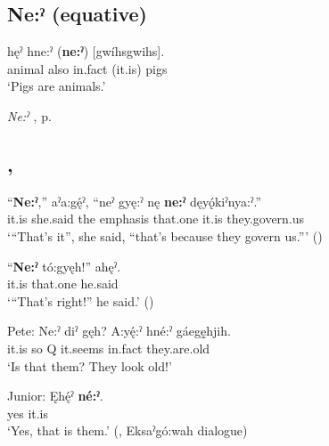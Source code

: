 \subsection*{\textbf{Ne:ˀ}  (equative)} \label{p:[ne:ˀ] equative}

\ea
\label{ex:npar38}
\gll [Ganyó:ˀ] hęˀ hne:ˀ (\textbf{ne:ˀ}) [gwíhsgwihs].\\
animal also in.fact (it.is) pigs\\
\glt ‘Pigs are animals.’
\z

\begin{CayugaRelated}
\item \textit{Ne:ˀ} , p. \pageref{p:[ne:ˀ] `it is’}
\end{CayugaRelated}

\largerpage
\subsection*{ , } \label{p:[ne:ˀ] ‘just so’}

\ea
\label{ex:npar39}
\gll “\textbf{Ne:ˀ},” aˀa:gę́ˀ, “neˀ gyę:ˀ nę \textbf{ne:ˀ} dęyǫ́kiˀnya:ˀ.”\\
it.is she.said the emphasis that.one it.is they.govern.us\\
\glt ‘“That’s it”, she said, “that’s because they govern us.”’ (\cite{henry_de_2005})
\z

\ea
\label{ex:npar40}
\gll “\textbf{Ne:ˀ} tó:gyęh!” ahęˀ.\\
it.is that.one he.said\\
\glt ‘“That’s right!” he said.’ (\cite{henry_de_2005})
\z

\ea
\label{ex:npar41}
\gll Pete: Ne:ˀ diˀ gęh? A:yę́:ˀ hné:ˀ gáegę̱hjih.\\
{} it.is so Q it.seems in.fact they.are.old\\
\glt ‘Is that them? They look old!’


\gll Junior: Ęhę́ˀ \textbf{né:ˀ}.\\
{} yes it.is\\
\glt ‘Yes, that is them.’ (\cite[88]{mithun_watewayestanih_1984}, Eksaˀgó:wah dialogue)
\z

